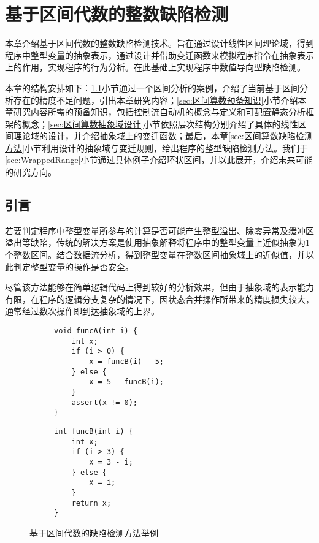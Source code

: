 
\chapter{基于区间代数的整数缺陷检测}
\label{sec:区间算数}

本章介绍基于区间代数的整数缺陷检测技术。旨在通过设计线性区间理论域，得到程序中整型变量的抽象表示，通过设计并借助变迁函数来模拟程序指令在抽象表示上的作用，实现程序的行为分析。在此基础上实现程序中数值导向型缺陷检测。

本章的结构安排如下：\ref{sec:区间算数引言}小节通过一个区间分析的案例，介绍了当前基于区间分析存在的精度不足问题，引出本章研究内容；\ref{sec:区间算数预备知识}小节介绍本章研究内容所需的预备知识，包括控制流自动机的概念与定义和可配置静态分析框架的概念；\ref{sec:区间算数抽象域设计}小节依照层次结构分别介绍了具体的线性区间理论域的设计，并介绍抽象域上的变迁函数；最后，本章\ref{sec:区间算数缺陷检测方法}小节利用设计的抽象域与变迁规则，给出程序的整型缺陷检测方法。我们于\ref{sec:WrappedRange}小节通过具体例子介绍环状区间，并以此展开，介绍未来可能的研究方向。


\section{引言}
\label{sec:区间算数引言}

若要判定程序中整型变量所参与的计算是否可能产生整型溢出、除零异常及缓冲区溢出等缺陷，传统的解决方案是使用抽象解释将程序中的整型变量上近似抽象为1个整数区间。结合数据流分析，得到整型变量在整数区间抽象域上的近似值，并以此判定整型变量的操作是否安全。

尽管该方法能够在简单逻辑代码上得到较好的分析效果，但由于抽象域的表示能力有限，在程序的逻辑分支复杂的情况下，因状态合并操作所带来的精度损失较大，通常经过数次操作即到达抽象域的上界。

\begin{figure}[htb]
	\begin{subfigure}[b]{.5\linewidth}
			\begin{lstlisting}[xleftmargin=.15\textwidth]
void funcA(int i) {
	int x;
	if (i > 0) {
		x = funcB(i) - 5;
	} else {
		x = 5 - funcB(i);
	}
	assert(x != 0);
}
			\end{lstlisting}
	\end{subfigure}
	\begin{subfigure}[b]{.5\linewidth}
			\begin{lstlisting}[xleftmargin=.25\textwidth]
int funcB(int i) {
	int x;
	if (i > 3) {
		x = 3 - i;
	} else {
		x = i;
	}
	return x;
}
			\end{lstlisting}
\end{subfigure}
	\caption{基于区间代数的缺陷检测方法举例}
	\label{fig:codeExampleForSignRange}
\end{figure}{\tiny }

